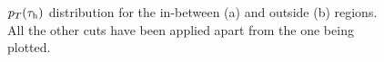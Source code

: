 \begin{figure}[ht]
	\centering
	\hfill
	\caption{$p_T(\tau_\text{h})$ distribution for the in-between (a) and outside (b) regions. All the other cuts have been applied apart from the one being plotted.}
	\label{Fig12}
\end{figure} 
